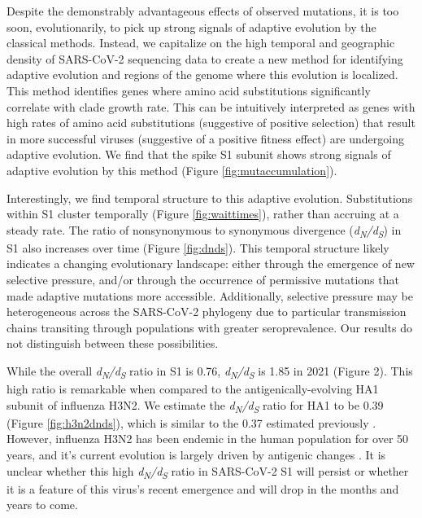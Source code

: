 \documentclass[11pt,oneside,letterpaper]{article}
\begin{document}
Despite the demonstrably advantageous effects of observed mutations, it is too soon, evolutionarily, to pick up strong signals of adaptive evolution by the classical methods. 
Instead, we capitalize on the high temporal and geographic density of SARS-CoV-2 sequencing data to create a new method for identifying adaptive evolution and regions of the genome where this evolution is localized. 
This method identifies genes where amino acid substitutions significantly correlate with clade growth rate. 
This can be intuitively interpreted as genes with high rates of amino acid substitutions (suggestive of positive selection) that result in more successful viruses (suggestive of a positive fitness effect) are undergoing adaptive evolution. 
We find that the spike S1 subunit shows strong signals of adaptive evolution by this method (Figure \ref{fig:mutaccumulation}).

Interestingly, we find temporal structure to this adaptive evolution. Substitutions within S1 cluster temporally (Figure \ref{fig:waittimes}), rather than accruing at a steady rate. 
The ratio of nonsynonymous to synonymous divergence (\emph{d\textsubscript{N}/d\textsubscript{S}}) in S1 also increases over time (Figure \ref{fig:dnds}). 
This temporal structure likely indicates a changing evolutionary landscape: either through the emergence of new selective pressure, and/or through the occurrence of permissive mutations that made adaptive mutations more accessible. 
Additionally, selective pressure may be heterogeneous across the SARS-CoV-2 phylogeny due to particular transmission chains transiting through populations with greater seroprevalence. Our results do not distinguish between these possibilities.

 While the overall \emph{d\textsubscript{N}/d\textsubscript{S}} ratio in S1 is 0.76, \emph{d\textsubscript{N}/d\textsubscript{S}} is 1.85 in 2021 (Figure 2). 
 This high ratio is remarkable when compared to the antigenically-evolving HA1 subunit of influenza H3N2. We estimate the \emph{d\textsubscript{N}/d\textsubscript{S}} ratio for HA1 to be 0.39 (Figure \ref{fig:h3n2dnds}), which is similar to the 0.37 estimated previously \cite{Wolf2006-vy}. 
 However, influenza H3N2 has been endemic in the human population for over 50 years, and it’s current evolution is largely driven by antigenic changes \cite{Smith2004-if}. 
 It is unclear whether this high \emph{d\textsubscript{N}/d\textsubscript{S}} ratio in SARS-CoV-2 S1 will persist or whether it is a feature of this virus’s recent emergence and will drop in the months and years to come.
\end{document}
